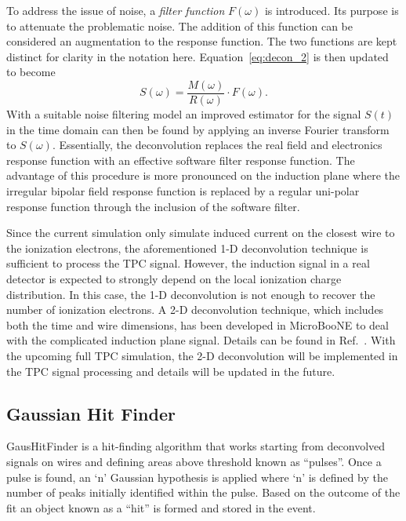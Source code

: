 To address the issue of noise, a \textit{filter function} $F(\omega)$ is
introduced.  Its purpose is to attenuate the problematic noise.  The
addition of this function can be considered an augmentation to the
response function.  
The two functions are kept distinct for clarity in the notation here.
Equation~\eqref{eq:decon_2} is then updated to become
\begin{equation}\label{eq:decon_filt}
S(\omega) = \frac{M(\omega)}{R(\omega)} \cdot F(\omega).
\end{equation}
With a suitable noise filtering model an improved estimator for the signal
$S(t)$ in the time domain can then be found by applying an inverse Fourier 
transform to $S(\omega)$.  Essentially, the deconvolution replaces the real field and 
electronics response function with an effective software filter response function. The 
advantage of this procedure is more pronounced on the induction plane where the irregular bipolar field response function is replaced by a regular uni-polar response function through the inclusion of the software filter. 

Since the current simulation only simulate induced current on the closest 
wire to the ionization electrons, the aforementioned 1-D deconvolution 
technique is sufficient to process the TPC signal. However, the induction 
signal in a real detector is expected to strongly depend on the local ionization charge distribution. In this case, the 1-D deconvolution is not 
enough to recover the number of ionization electrons. A 2-D deconvolution
technique, which includes both the time and wire dimensions, has been 
developed in MicroBooNE to deal with the complicated induction plane signal. Details can be found in Ref.~\cite{ref:uboone_signal_processing}. With the upcoming full TPC simulation, the 2-D deconvolution will be implemented 
in the TPC signal processing and details will be updated in the future.


\subsection{Gaussian Hit Finder}
GausHitFinder is a hit-finding algorithm that works starting from deconvolved signals on wires and defining areas above threshold known as ``pulses''. Once a pulse is found, an `n' Gaussian hypothesis is applied where `n' is defined by the number of peaks initially identified within the pulse. Based on the outcome of the fit an object known as a ``hit'' is formed and stored in the event.

